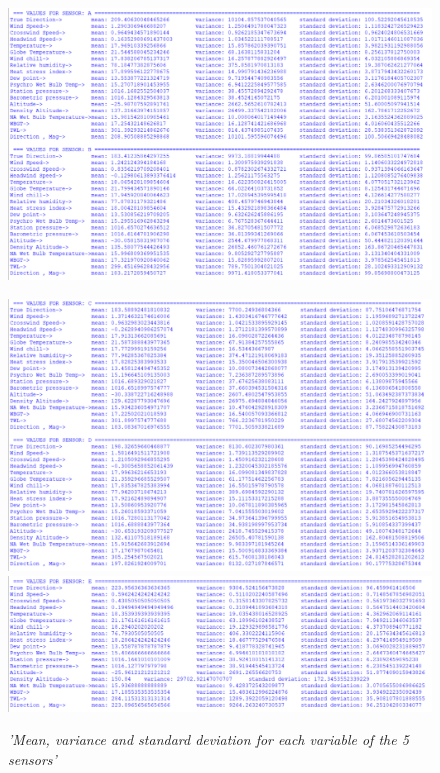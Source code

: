 \documentclass[a4paper,12pt]{article}
\begin{document}
\begin{figure}[H]
    \centering
    \includegraphics[width=\textwidth]{Graphs/Statistcal Indicators AB.PNG}
\end{figure}
\begin{figure}[H]
\centering
\includegraphics[width=\textwidth]{Graphs/Statistcal Indicators CD.PNG}
\includegraphics[width=\textwidth]{Graphs/Statistcal Indicators E.PNG}
\caption{\it'Mean, variance and standard deviation for each variable of the 5 sensors'}
\end{figure}
\end{document}

